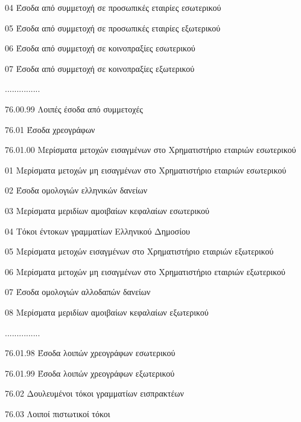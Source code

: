 \documentclass[A4,10pt,greek]{book}
\begin{document}
                               04    Έσοδα από συμμετοχή σε προσωπικές εταιρίες εσωτερικού 

                               05    Έσοδα από συμμετοχή σε προσωπικές εταιρίες εξωτερικού 

                               06    Έσοδα από συμμετοχή σε κοινοπραξίες εσωτερικού 

                               07    Έσοδα από συμμετοχή σε κοινοπραξίες εξωτερικού 

                     ...............

                     76.00.99    Λοιπές έσοδα από συμμετοχές

        76.01    Έσοδα χρεογράφων 

                     76.01.00    Μερίσματα μετοχών εισαγμένων στο Χρηματιστήριο εταιριών
                                       εσωτερικού 

                               01    Μερίσματα μετοχών μη εισαγμένων στο Χρηματιστήριο
                                       εταιριών εσωτερικού 

                               02    Έσοδα ομολογιών ελληνικών δανείων 

                               03    Μερίσματα μεριδίων αμοιβαίων κεφαλαίων εσωτερικού 

                               04    Τόκοι έντοκων γραμματίων Ελληνικού Δημοσίου 

                               05    Μερίσματα μετοχών εισαγμένων στο Χρηματιστήριο εταιριών
                                       εξωτερικού 

                               06    Μερίσματα μετοχών μη εισαγμένων στο Χρηματιστήριο
                                       εταιριών εξωτερικού 

                               07    Έσοδα ομολογιών αλλοδαπών δανείων 

                               08    Μερίσματα μεριδίων αμοιβαίων κεφαλαίων εξωτερικού 

                     ...............

                     76.01.98    Έσοδα λοιπών χρεογράφων εσωτερικού

                     76.01.99    Έσοδα λοιπών χρεογράφων εξωτερικού

        76.02    Δουλευμένοι τόκοι γραμματίων εισπρακτέων 

        76.03    Λοιποί πιστωτικοί τόκοι 
\end{document}
